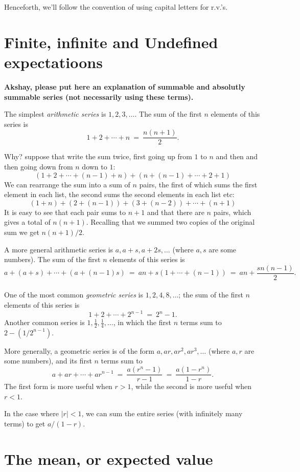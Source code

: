 Henceforth, we'll follow the convention of using capital letters for r.v.'s.

\section{Finite, infinite and Undefined expectatioons}

{\bf Akshay, please put here an explanation of summable and absolutly
summable series (not necessarily using these terms).}


The simplest {\it arithmetic series} is $1,2,3,\ldots$. The sum of the first 
$n$ elements of this series is
$$ 1 + 2 + \cdots + n \ = \ \frac{n(n+1)}{2} .$$

Why? suppose that write the sum twice, first going up from $1$ to $n$
and then and then going down from $n$ down to $1$:
$$ \left(1 + 2 + \cdots + (n-1) + n\right) + 
\left(n + (n-1) + \cdots + 2 + 1\right) $$
We can rearrange the sum into a sum of $n$ pairs, the first of which
sums the first element in each list, the second sums the second
elements in each list etc:
$$ (1+n) + (2+(n-1)) + (3+(n-2)) + \cdots + (n+1) $$
It is easy to see that each pair sums to $n+1$ and that there are $n$
pairs, which gives a total of $n(n+1)$. Recalling that we summed two
copies of the original sum we get $n(n+1)/2$.

A more general arithmetic series is $a, a+s, a+2s, \ldots$
(where $a,s$ are some numbers). The sum of the first $n$ elements of this series is
$$ a + (a+s) + \cdots + (a + (n-1)s)
\ = \ 
an + s(1 + \cdots + (n-1))
\ = \ 
an + \frac{sn(n-1)}{2}.
$$
\\

One of the most common {\it geometric series} is $1, 2, 4, 8, \ldots$; the sum
of the first $n$ elements of this series is
$$ 1 + 2 + \cdots + 2^{n-1} \ = \ 2^n - 1 .$$
Another common series is $1, \frac{1}{2}, \frac{1}{4}, \ldots$,
in which the first $n$ terms sum to $2 - (1/2^{n-1})$.

More generally, a geometric series is of the form $a, ar, ar^2, ar^3, \ldots$
(where $a,r$ are some numbers), and its first $n$ terms sum to
$$ a + ar + \cdots + ar^{n-1} 
\ = \ 
\frac{a(r^n-1)}{r-1}
\ = \ 
\frac{a(1-r^n)}{1-r}.$$
The first form is more useful when $r > 1$, while the second is more useful when $r< 1$.

In the case where $|r| < 1$, we can sum the entire series (with infinitely many terms) 
to get $a/(1-r)$.

\section{The mean, or expected value}

